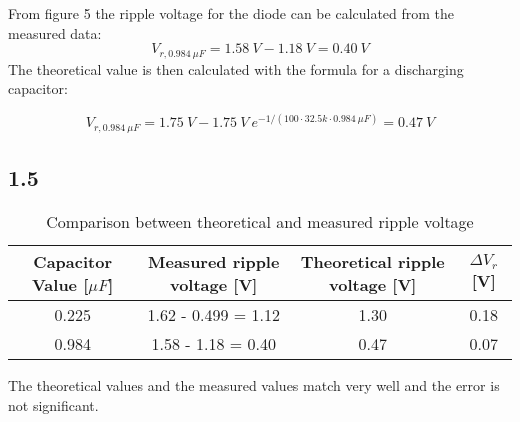     From figure 5 the ripple voltage for the diode can be calculated from the measured data: $$V_{r,0.984 \ \mu F} = 1.58 \ V - 1.18 \ V = 0.40 \ V $$
     The theoretical value is then calculated with the formula for a discharging capacitor:
    
     $$ V_{r,0.984 \ \mu F} = 1.75 \ V - 1.75 \ V \ e^{-1/(100 \cdot 32.5k \cdot 0.984 \ \mu F)} = 0.47 \ V $$

    

\subsection*{1.5}
    
   \begin{table}[htbp]
     \centering
     \caption{Comparison between theoretical and measured ripple voltage}
       \begin{tabular}{c|c|c|c}
       Capacitor Value [$\mu F$] & Measured ripple voltage [V] & Theoretical ripple voltage [V] & $\Delta V_r$ [V] \\
       \hline
       0.225         &     1.62 - 0.499 = 1.12        & 1.30 & 0.18 \\
       0.984         &     1.58 - 1.18 = 0.40         & 0.47 & 0.07 \\       
       \end{tabular}%
     \label{tab:addlabel}%
   \end{table}%

The theoretical values and the measured values match very well and the error is not significant.

    




